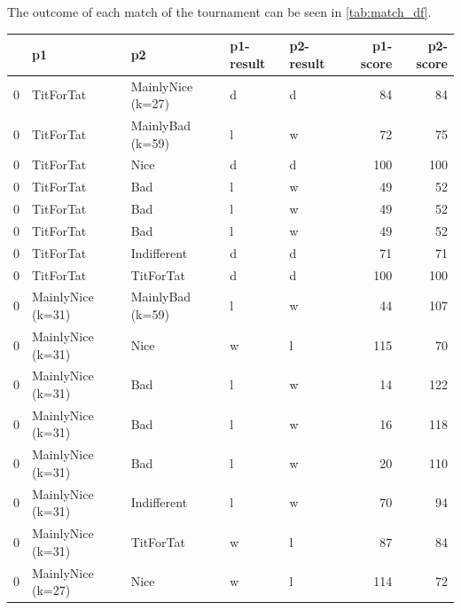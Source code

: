 \documentclass[journal,a4paper,10pt,twoside]{IEEEtran}
\begin{document}
The outcome of each match of the tournament can be seen in \autoref{tab:match_df}.
\begin{table}[]
    \centering
    \begin{tabular}{lllllrr}
    \toprule
    {} &                 p1 &                 p2 & p1-result & p2-result &  p1-score &  p2-score \\
    \midrule
    0 &          TitForTat &  MainlyNice (k=27) &         d &         d &        84 &        84 \\
    0 &          TitForTat &   MainlyBad (k=59) &         l &         w &        72 &        75 \\
    0 &          TitForTat &               Nice &         d &         d &       100 &       100 \\
    0 &          TitForTat &                Bad &         l &         w &        49 &        52 \\
    0 &          TitForTat &                Bad &         l &         w &        49 &        52 \\
    0 &          TitForTat &                Bad &         l &         w &        49 &        52 \\
    0 &          TitForTat &        Indifferent &         d &         d &        71 &        71 \\
    0 &          TitForTat &          TitForTat &         d &         d &       100 &       100 \\
    0 &  MainlyNice (k=31) &   MainlyBad (k=59) &         l &         w &        44 &       107 \\
    0 &  MainlyNice (k=31) &               Nice &         w &         l &       115 &        70 \\
    0 &  MainlyNice (k=31) &                Bad &         l &         w &        14 &       122 \\
    0 &  MainlyNice (k=31) &                Bad &         l &         w &        16 &       118 \\
    0 &  MainlyNice (k=31) &                Bad &         l &         w &        20 &       110 \\
    0 &  MainlyNice (k=31) &        Indifferent &         l &         w &        70 &        94 \\
    0 &  MainlyNice (k=31) &          TitForTat &         w &         l &        87 &        84 \\
    0 &  MainlyNice (k=27) &               Nice &         w &         l &       114 &        72 \\

\end{tabular}
\end{table}
\end{document}
